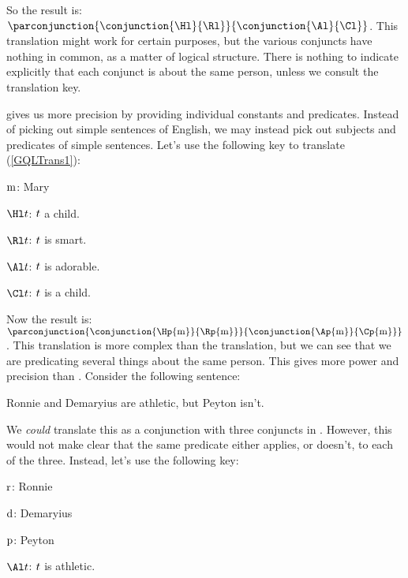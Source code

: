 \noindent{}So the \GSL{} result is: $\parconjunction{\conjunction{\Hl}{\Rl}}{\conjunction{\Al}{\Cl}}$.  This translation might work for certain purposes, but the various conjuncts have nothing in common, as a matter of logical structure.  There is nothing to indicate explicitly that each conjunct is about the same person, unless we consult the translation key.

\GQL{} gives us more precision by providing individual constants and predicates.  Instead of picking out simple sentences of English, we may instead pick out subjects and predicates of simple sentences.  Let's use the following \GQL{} key to translate (\ref{GQLTrans1}):

\begin{description}[itemsep=0em]
	\item[Translation Key:] \hfill{} 
	\begin{description}[itemsep=0em]
		\item[] $\mathrm{m}$: Mary
		\item[] $\Hl\variable{t}$: $t$ a child. 
		\item[] $\Rl\variable{t}$: $t$ is smart. 
		\item[] $\Al\variable{t}$: $t$ is adorable.
		\item[] $\Cl\variable{t}$: $t$ is a child.  
	\end{description}
\end{description}

\noindent{}Now the result is: $\parconjunction{\conjunction{\Hp{\constant{m}}}{\Rp{\constant{m}}}}{\conjunction{\Ap{\constant{m}}}{\Cp{\constant{m}}}}$.  This translation is more complex than the \GSL{} translation, but we can see that we are predicating several things about the same person.  This gives \GQL{} more power and precision than \GSL{}.  Consider the following sentence:

\begin{menumerate}
	\item\label{GQLTrans2} Ronnie and Demaryius are athletic, but Peyton isn't.
\end{menumerate}

\noindent{}We \emph{could} translate this as a conjunction with three conjuncts in \GSL{}.  However, this would not make clear that the same predicate either applies, or doesn't, to each of the three.  Instead, let's use the following \GQL{} key:

\begin{description}[itemsep=0em]
	\item[Translation Key:] \hfill{} 
	\begin{description}[itemsep=0em]
		\item[] $\mathrm{r}$: Ronnie
		\item[] $\mathrm{d}$: Demaryius
		\item[] $\mathrm{p}$: Peyton
		\item[] $\Al\variable{t}$: $t$ is athletic.
	\end{description}
\end{description}

